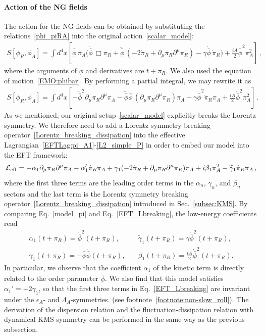 \documentclass[a4paper,11pt]{article}
\begin{document}
\paragraph{Action of the NG fields}
The action for the NG fields can be obtained by substituting 
the relations~\eqref{phi_piRA} into the original action~\eqref{scalar_model}:
\begin{align}
S[\phi_R,\phi_A] 
=\int d^4x\left[
\dot{\bar{\phi}}\,\pi_A\Big(\dot{\bar{\phi}}\,\Box\pi_R+\ddot{\bar{\phi}}\,(-2\dot{\pi}_R+\partial_\mu\pi_R\partial^\mu\pi_R)
 - \gamma\dot{\bar{\phi}}\,\dot{\pi}_R\Big)
 +\frac{iA}{2}\dot{\bar{\phi}}^2\pi_A^2
 \right]\,,
\end{align}
where the arguments of $\bar{\phi}$ and derivatives are $t+\pi_R$. We also used the equation of motion~\eqref{EMO:phibar}. By performing a partial integral, we may rewrite it as
\begin{align}
\label{model_pi}
S[\phi_R,\phi_A] 
=\int d^4x\left[
-\dot{\bar{\phi}}^2
\partial_\mu\pi_R\partial^\mu\pi_A
-\ddot{\bar{\phi}}\dot{\bar{\phi}}\,
(\partial_\mu\pi_R\partial^\mu\pi_R)\pi_A
 - \gamma\dot{\bar{\phi}}^2\dot{\pi}_R\pi_A
 +\frac{iA}{2}\dot{\bar{\phi}}^2\pi_A^2
 \right]\,.
\end{align}
As we mentioned, our original setup~\eqref{scalar_model} explicitly breaks the Lorentz symmetry. We therefore need to add a Lorentz symmetry breaking operator~\eqref{Lorentz_breaking_dissipation}
into the effective Lagrangian~\eqref{EFTLag:pi_A1}-\eqref{L2_simple_P} in order to embed our model into the EFT framework:
\begin{align}
\label{EFT_Lbreaking}
\mathcal{L}_{\rm eff}=
-\alpha_1
\partial_\mu\pi_R\partial^\mu\pi_A
-\alpha_1'\dot{\pi}_R\pi_A
+\gamma_1
(-2\dot{\pi}_R+\partial_\mu\pi_R\partial^\mu\pi_R)\pi_A
+i\beta_1\pi_A^2
- \widetilde{\gamma}_1\dot{\pi}_R\pi_A\,,
\end{align}
where the first three terms are the leading order terms in the $\alpha_n$, $\gamma_n$, and $\beta_n$ sectors and the last term is the Lorentz symmetry breaking operator~\eqref{Lorentz_breaking_dissipation} introduced in Sec.~\ref{subsec:KMS}.
By comparing Eq.~\eqref{model_pi} and Eq.~\eqref{EFT_Lbreaking}, the low-energy coefficients read
\begin{align}
\nonumber
\alpha_1(t+\pi_R)=\dot{\bar{\phi}}^2(t+\pi_R),& \quad \widetilde{\gamma}_1(t+\pi_R)=\gamma\dot{\bar{\phi}}^2(t+\pi_R),
\\
\gamma_1(t+\pi_R)=-\dot{\bar{\phi}}\ddot{\bar{\phi}}(t+\pi_R),& \quad \beta_1(t+\pi_R)=\frac{iA}{2}\dot{\bar{\phi}}^2(t+\pi_R).
\end{align}
In particular, we observe that the coefficient $\alpha_1$ of the kinetic term is directly related to the order parameter $\dot{\bar{\phi}}$. 
We also find that this model satisfies $\alpha_1'=-2\gamma_1$, so that the first three terms in Eq.~\eqref{EFT_Lbreaking} are invariant under the $\epsilon_A$- and $\Lambda_A$-symmetries. (see footnote~\ref{footnote:non-slow_roll}).  
The derivation of the dispersion relation and the fluctuation-dissipation relation with dynamical KMS symmetry can be performed in the same way as the previous subsection.
\end{document}
